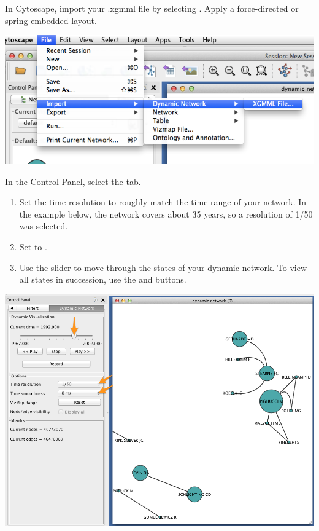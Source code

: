 \documentclass[letterpaper,10pt,english]{sphinxmanual}
\begin{document}
In Cytoscape, import your .xgmml file by selecting
. Apply a force-directed or
spring-embedded layout.

{\hfill\includegraphics{coauthors.34.png}\hfill}

In the Control Panel, select the  tab.
\begin{enumerate}
\item {} 
Set the time resolution to roughly match the time-range of your network. In the
example below, the network covers about 35 years, so a resolution of 1/50 was selected.

\item {} 
Set  to .

\item {} 
Use the slider to move through the states of your dynamic network. To view all states
in succession, use the  and  buttons.

\end{enumerate}

{\hfill\includegraphics{coauthors.37.png}\hfill}
\end{document}
